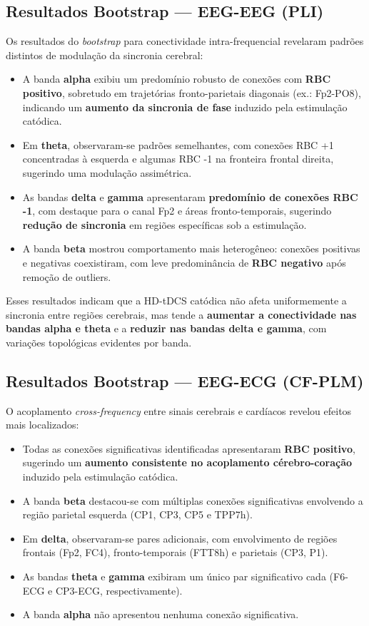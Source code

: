 \subsection{Resultados Bootstrap — EEG-EEG (PLI)}

Os resultados do \textit{bootstrap} para conectividade intra-frequencial revelaram padrões distintos de modulação da sincronia cerebral:

\begin{itemize}
  \item A banda \textbf{alpha} exibiu um predomínio robusto de conexões com \textbf{RBC positivo}, sobretudo em trajetórias fronto-parietais diagonais (ex.: Fp2-PO8), indicando um \textbf{aumento da sincronia de fase} induzido pela estimulação catódica.
  \item Em \textbf{theta}, observaram-se padrões semelhantes, com conexões RBC +1 concentradas à esquerda e algumas RBC -1 na fronteira frontal direita, sugerindo uma modulação assimétrica.
  \item As bandas \textbf{delta} e \textbf{gamma} apresentaram \textbf{predomínio de conexões RBC -1}, com destaque para o canal Fp2 e áreas fronto-temporais, sugerindo \textbf{redução de sincronia} em regiões específicas sob a estimulação.
  \item A banda \textbf{beta} mostrou comportamento mais heterogêneo: conexões positivas e negativas coexistiram, com leve predominância de \textbf{RBC negativo} após remoção de outliers.
\end{itemize}

Esses resultados indicam que a HD-tDCS catódica não afeta uniformemente a sincronia entre regiões cerebrais, mas tende a \textbf{aumentar a conectividade nas bandas alpha e theta} e a \textbf{reduzir nas bandas delta e gamma}, com variações topológicas evidentes por banda.

\subsection{Resultados Bootstrap — EEG-ECG (CF-PLM)}

O acoplamento \textit{cross-frequency} entre sinais cerebrais e cardíacos revelou efeitos mais localizados:

\begin{itemize}
  \item Todas as conexões significativas identificadas apresentaram \textbf{RBC positivo}, sugerindo um \textbf{aumento consistente no acoplamento cérebro-coração} induzido pela estimulação catódica.
  \item A banda \textbf{beta} destacou-se com múltiplas conexões significativas envolvendo a região parietal esquerda (CP1, CP3, CP5 e TPP7h).
  \item Em \textbf{delta}, observaram-se pares adicionais, com envolvimento de regiões frontais (Fp2, FC4), fronto-temporais (FTT8h) e parietais (CP3, P1).
  \item As bandas \textbf{theta} e \textbf{gamma} exibiram um único par significativo cada (F6-ECG e CP3-ECG, respectivamente).
  \item A banda \textbf{alpha} não apresentou nenhuma conexão significativa.
\end{itemize}

